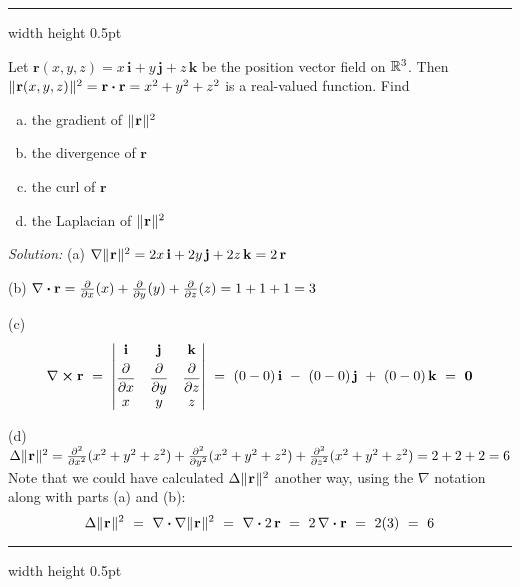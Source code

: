 \medskip
\hrule width \textwidth height 0.5pt
\begin{exmp}\label{exmp:laplposition}
 Let $\mathbf{r}(x,y,z) = x\,\mathbf{i} + y\,\mathbf{j} + z\,\mathbf{k}$ be the position vector field on
 $\mathbb{R}^{3}$. Then $\lVert\mspace{1mu}\mathbf{r}(x,y,z)\mspace{1mu}\rVert^2 = \mathbf{r} \bm{\cdot} \mathbf{r} = x^2 + y^2 + z^2$ is a real-valued
 function. Find
 \begin{enumerate}[(a)]
  \item the gradient of $\lVert\mspace{1mu}\mathbf{r}\mspace{1mu}\rVert^2$
  \item the divergence of $\mathbf{r}$
  \item the curl of $\mathbf{r}$
  \item the Laplacian of $\lVert\mspace{1mu}\mathbf{r}\mspace{1mu}\rVert^2$
 \end{enumerate}

 \par\noindent \emph{Solution:} (a) $\nabla \lVert\mspace{1mu}\mathbf{r}\mspace{1mu}\rVert^2 = 2x\,\mathbf{i} + 2y\,\mathbf{j} + 2z\,\mathbf{k}
  = 2\,\mathbf{r}$\smallskip
 \par\noindent (b) $\nabla \bm{\cdot} \mathbf{r} = \frac{\partial}{\partial x}(x) + \frac{\partial}{\partial y}(y) +
  \frac{\partial}{\partial z}(z) = 1+1+1=3$\smallskip
 \par\noindent (c)
 \begin{displaymath}
  \Crossprod{\nabla}{\mathbf{r}} ~=~ \begin{vmatrix}
  \mathbf{i} & \mathbf{j} & \mathbf{k} \smallskip\\ \dfrac{\partial}{\partial x} & \dfrac{\partial}{\partial y} &
   \dfrac{\partial}{\partial z} \\
  x & y & z
 \end{vmatrix} ~=~ (0-0)\,\mathbf{i} ~-~ (0-0)\,\mathbf{j} ~+~ (0-0)\,\mathbf{k} ~=~ \mathbf{0}
 \end{displaymath}
 \par\noindent (d) $\Delta \lVert\mspace{1mu}\mathbf{r}\mspace{1mu}\rVert^2 = \frac{\partial^2}{\partial x^2}(x^2 + y^2 + z^2 ) +
  \frac{\partial^2}{\partial y^2}(x^2 + y^2 + z^2 ) + \frac{\partial^2}{\partial z^2}(x^2 + y^2 + z^2 ) =
  2+2+2=6$\smallskip\\
  Note that we could have calculated $\Delta \lVert\mspace{1mu}\mathbf{r}\mspace{1mu}\rVert^2$ another way, using the $\nabla$ notation along with
  parts (a) and (b):
  \begin{displaymath}
   \Delta \lVert\mspace{1mu}\mathbf{r}\mspace{1mu}\rVert^2 ~=~ \nabla \bm{\cdot} \nabla \lVert\mspace{1mu}\mathbf{r}\mspace{1mu}\rVert^2 ~=~ \nabla \bm{\cdot} 2\,\mathbf{r} ~=~
   2\,\nabla \bm{\cdot} \mathbf{r} ~=~ 2(3) ~=~ 6
  \end{displaymath}
\end{exmp}
\hrule width \textwidth height 0.5pt
\medskip

